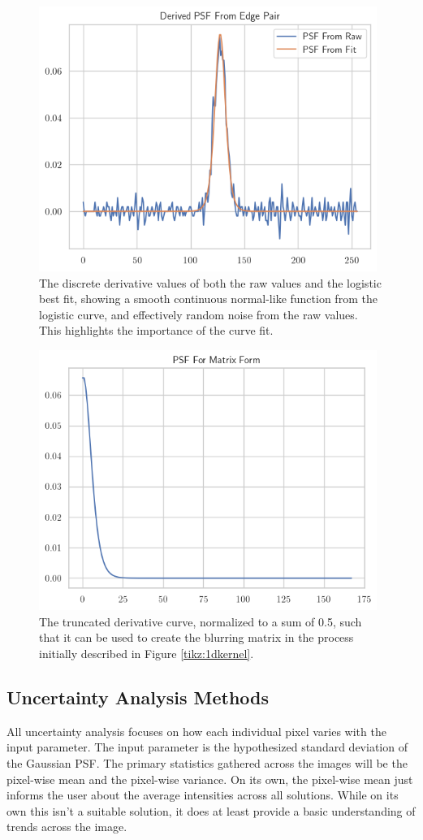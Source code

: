 \documentclass[letterpaper, 11pt, titlepage, twocolumn]{article}
\begin{document}
\begin{figure}[H]
  \centering
  \includegraphics[width=11cm]{derivedpsf.png}
  \caption{The discrete derivative values of both the raw values and the logistic best fit, showing a smooth continuous normal-like function from the logistic curve, and effectively random noise from the raw values. This highlights the importance of the curve fit.}
  \label{fig:psf}
\end{figure}

\begin{figure}[H]
  \centering
  \includegraphics[width=11cm]{matrixpsf.png}
  \caption{The truncated derivative curve, normalized to a sum of 0.5, such that it can be used to create the blurring matrix in the process initially described in Figure \ref{tikz:1dkernel}.}
  \label{fig:psfmatrix}
\end{figure}

\subsection{Uncertainty Analysis Methods}
All uncertainty analysis focuses on how each individual pixel varies with the input parameter. The input parameter is the hypothesized standard deviation of the Gaussian PSF. The primary statistics gathered across the images will be the pixel-wise mean and the pixel-wise variance. On its own, the pixel-wise mean just informs the user about the average intensities across all solutions. While on its own this isn't a suitable solution, it does at least provide a basic understanding of trends across the image. 
\end{document}
